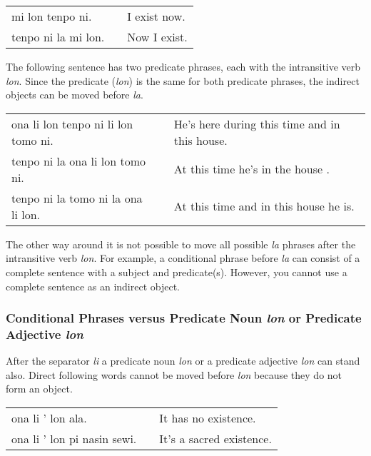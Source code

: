 \begin{supertabular}{p{5,5cm}|ll}
mi lon tenpo ni. && I exist now. \\
tenpo ni la mi lon. && Now I exist. \\
\end{supertabular}

The following sentence has two predicate phrases, each with the intransitive verb \textit{lon}. 
Since the predicate (\textit{lon}) is the same for both predicate phrases, the indirect objects can be moved before \textit{la}. 

\begin{supertabular}{p{5,5cm}|ll}
ona li lon tenpo ni li lon tomo ni. && He's here during this time and in this house. \\
tenpo ni la ona li lon tomo ni.     && At this time he's in the house . \\  
tenpo ni la tomo ni la ona li lon.  && At this time and in this house he is. \\  
\end{supertabular}

The other way around it is not possible to move all possible \textit{la} phrases after the intransitive verb \textit{lon}. 
For example, a conditional phrase before \textit{la} can consist of a complete sentence with a subject and predicate(s). 
However, you cannot use a complete sentence as an indirect object.

%
%
\subsubsection*{Conditional Phrases versus Predicate Noun \textit{lon} or Predicate Adjective \textit{lon} }
%
%

After the separator \textit{li} a predicate noun \textit{lon} or a predicate adjective \textit{lon} can stand also. 
Direct following words cannot be moved before \textit{lon} because they do not form an object. 

\begin{supertabular}{p{5,5cm}|ll}
ona li ' lon ala. &&  It has no existence. \\
ona li ' lon pi nasin sewi. && It's a sacred existence. \\
\end{supertabular}

%
\newpage
%
